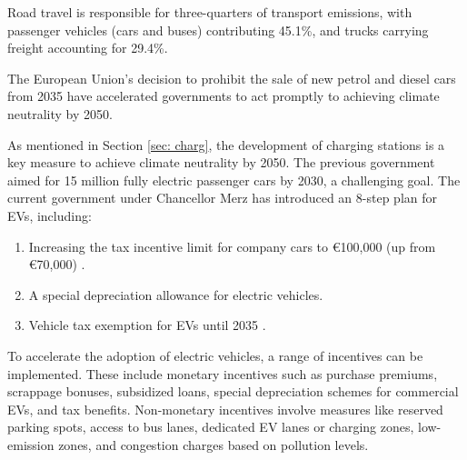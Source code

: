Road travel is responsible for three-quarters of transport emissions, with passenger vehicles (cars and buses) contributing 45.1\%, and trucks carrying freight accounting for 29.4\%. \cite{owid-co2-emissions-from-transport}

The European Union's decision to prohibit the sale of new petrol and diesel cars from 2035 have accelerated governments to act promptly to achieving climate neutrality by 2050. \cite{TopicsEuParliament}

As mentioned in Section \ref{sec: charg}, the development of charging stations is a key measure to achieve climate neutrality by 2050. The previous government aimed for 15 million fully electric passenger cars by 2030, a challenging goal. The current government under Chancellor Merz has introduced an 8-step plan for EVs, including:
\begin{enumerate}
	\item Increasing the tax incentive limit for company cars to €100,000 (up from €70,000) \cite{FrankfurterRundschau}.
	\item A special depreciation allowance for electric vehicles.
	\item Vehicle tax exemption for EVs until 2035 \cite{BusinessInsider}.
\end{enumerate}
To accelerate the adoption of electric vehicles, a range of incentives can be implemented. These include monetary incentives such as purchase premiums, scrappage bonuses, subsidized loans, special depreciation schemes for commercial EVs, and tax benefits. Non-monetary incentives involve measures like reserved parking spots, access to bus lanes, dedicated EV lanes or charging zones, low-emission zones, and congestion charges based on pollution levels. \cite{owid-co2-emissions-from-transport}